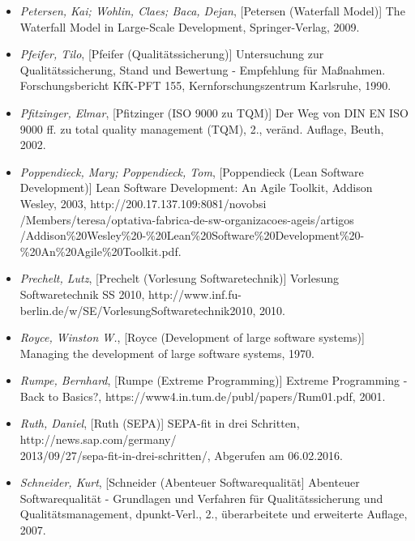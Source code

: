 \begin{itemize}
    \item[] \emph{Petersen, Kai; Wohlin, Claes; Baca, Dejan}, [Petersen (Waterfall Model)] The Waterfall Model in Large-Scale Development, Springer-Verlag, 2009.

    \item[] \emph{Pfeifer, Tilo}, [Pfeifer (Qualitätssicherung)] Untersuchung zur Qualitätssicherung, Stand und Bewertung - Empfehlung für Maßnahmen. Forschungsbericht KfK-PFT 155, Kernforschungszentrum Karlsruhe, 1990.

    \item[] \emph{Pfitzinger, Elmar}, [Pfitzinger (ISO 9000 zu TQM)] Der Weg von DIN EN ISO 9000 ff. zu total quality management (TQM), 2., veränd. Auflage, Beuth, 2002.

    \item[] \emph{Poppendieck, Mary; Poppendieck, Tom}, [Poppendieck (Lean Software Development)] Lean Software Development: An Agile Toolkit, Addison Wesley, 2003, http://200.17.137.109:8081/novobsi\\/Members/teresa/optativa-fabrica-de-sw-organizacoes-ageis/artigos
        /Addison\%20Wesley\%20-\%20Lean\%20Software\%20Development\%20-\%20An\%20Agile\%20Toolkit.pdf.

    \item[] \emph{Prechelt, Lutz}, [Prechelt (Vorlesung Softwaretechnik)] Vorlesung Softwaretechnik SS 2010, http://www.inf.fu-berlin.de/w/SE/VorlesungSoftwaretechnik2010, 2010.

    \item[] \emph{Royce, Winston W.}, [Royce (Development of large software systems)] Managing the development of large software systems, 1970.

    \item[] \emph{Rumpe, Bernhard}, [Rumpe (Extreme Programming)] Extreme Programming - Back to Basics?, https://www4.in.tum.de/publ/papers/Rum01.pdf, 2001.

    \item[] \emph{Ruth, Daniel}, [Ruth (SEPA)] SEPA-fit in drei Schritten, http://news.sap.com/germany/\\2013/09/27/sepa-fit-in-drei-schritten/, Abgerufen am 06.02.2016.

    \item[] \emph{Schneider, Kurt}, [Schneider (Abenteuer Softwarequalität] Abenteuer Softwarequalität - Grundlagen und Verfahren für Qualitätssicherung und Qualitätsmanagement, dpunkt-Verl., 2., überarbeitete und erweiterte Auflage, 2007.


\end{itemize}
